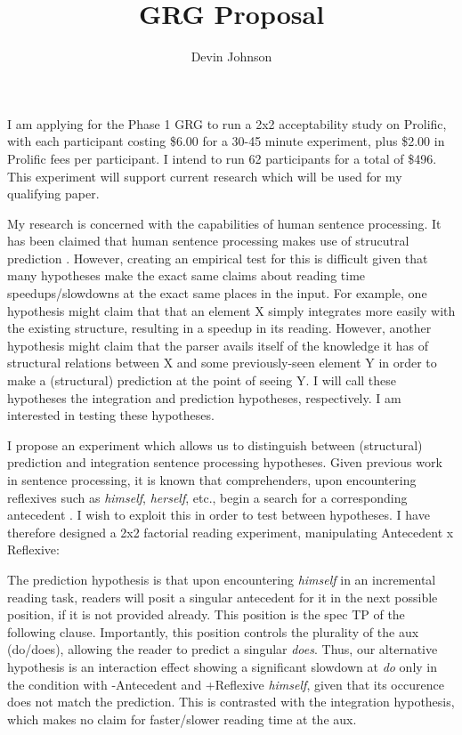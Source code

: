 \documentclass[12pt]{article}
\title{{\normalsize\bfseries {GRG Proposal}}}
\author{\normalsize {Devin Johnson}}
\date{\vspace{-10ex}}
\begin{document}
\maketitle

\vspace{5ex}

I am applying for the Phase 1 GRG to run a 2x2 acceptability study on Prolific, with each participant costing \$6.00 for a 30-45 minute experiment, plus \$2.00 in Prolific fees per participant. I intend to run 62 participants for a total of \$496. This experiment will support current research which will be used for my qualifying paper.

My research is concerned with the capabilities of human sentence processing. It has been claimed that human sentence processing makes use of strucutral prediction \cite{Kazanina2017,Yoshida-Dickey-Sturt2013}. However, creating an empirical test for this is difficult given that many hypotheses make the exact same claims about reading time speedups/slowdowns at the exact same places in the input. For example, one hypothesis might claim that that an element X simply integrates more easily with the existing structure, resulting in a speedup in its reading. However, another hypothesis might claim that the parser avails itself of the knowledge it has of structural relations between X and some previously-seen element Y in order to make a (structural) prediction at the point of seeing Y. I will call these hypotheses the integration and prediction hypotheses, respectively. I am interested in testing these hypotheses.

I propose an experiment which allows us to distinguish between (structural) prediction and integration sentence processing hypotheses. Given previous work in sentence processing, it is known that comprehenders, upon encountering reflexives such as \textit{himself}, \textit{herself}, etc., begin a search for a corresponding antecedent \cite{Sturt2003,Kazanina-Lau-Lieberman-Yoshida-Phillips2007}. I wish to exploit this in order to test between hypotheses. I have therefore designed a 2x2 factorial reading experiment, manipulating Antecedent x Reflexive:
\begin{exe}
\end{exe}
The prediction hypothesis is that upon encountering \textit{himself} in an incremental reading task, readers will posit a singular antecedent for it in the next possible position, if it is not provided already. This position is the spec TP of the following clause. Importantly, this position controls the plurality of the aux (do/does), allowing the reader to predict a singular \textit{does}. Thus, our alternative hypothesis is an interaction effect showing a significant slowdown at \textit{do} only in the condition with -Antecedent and +Reflexive \textit{himself}, given that its occurence does not match the prediction. This is contrasted with the integration hypothesis, which makes no claim for faster/slower reading time at the aux.
\end{document}
